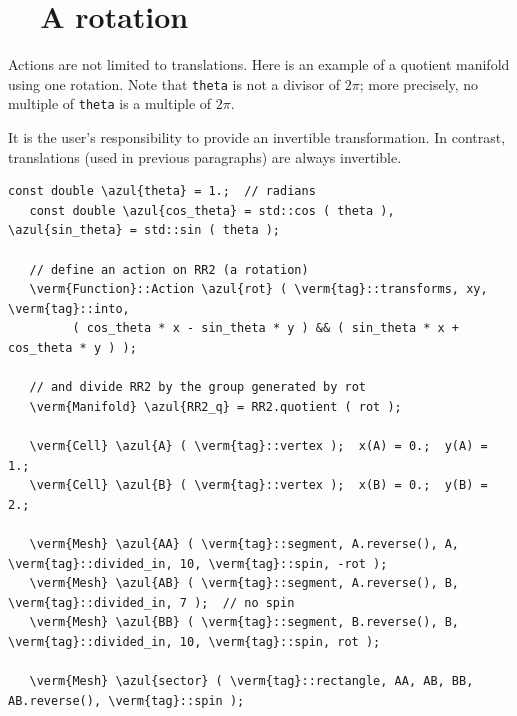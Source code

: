 \section{~~A rotation}\label{\numb section 7.\numb parag 11}

Actions are not limited to translations.
Here is an example of a quotient manifold using one rotation.
Note that {\small\tt theta} is not a divisor of $ 2\pi $;
more precisely, no multiple of {\small\tt theta} is a multiple of $ 2\pi $.

It is the user's responsibility to provide an invertible transformation.
In contrast, translations (used in previous paragraphs) are always invertible.

\begin{Verbatim}[commandchars=\\\{\},formatcom=\small\tt,frame=single,
   label=parag-\ref{\numb section 7.\numb parag 11}.cpp,rulecolor=\color{coment},
   baselinestretch=0.94,framesep=2mm                                             ]
   const double \azul{theta} = 1.;  // radians
   const double \azul{cos_theta} = std::cos ( theta ), \azul{sin_theta} = std::sin ( theta );
	
   // define an action on RR2 (a rotation)
   \verm{Function}::Action \azul{rot} ( \verm{tag}::transforms, xy, \verm{tag}::into,
         ( cos_theta * x - sin_theta * y ) && ( sin_theta * x + cos_theta * y ) );

   // and divide RR2 by the group generated by rot
   \verm{Manifold} \azul{RR2_q} = RR2.quotient ( rot );

   \verm{Cell} \azul{A} ( \verm{tag}::vertex );  x(A) = 0.;  y(A) = 1.;
   \verm{Cell} \azul{B} ( \verm{tag}::vertex );  x(B) = 0.;  y(B) = 2.;

   \verm{Mesh} \azul{AA} ( \verm{tag}::segment, A.reverse(), A, \verm{tag}::divided_in, 10, \verm{tag}::spin, -rot );
   \verm{Mesh} \azul{AB} ( \verm{tag}::segment, A.reverse(), B, \verm{tag}::divided_in, 7 );  // no spin
   \verm{Mesh} \azul{BB} ( \verm{tag}::segment, B.reverse(), B, \verm{tag}::divided_in, 10, \verm{tag}::spin, rot );

   \verm{Mesh} \azul{sector} ( \verm{tag}::rectangle, AA, AB, BB, AB.reverse(), \verm{tag}::spin );
\end{Verbatim}

